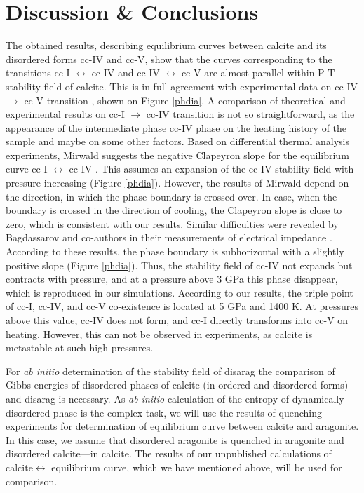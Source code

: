 \documentclass[journal=jacsat,manuscript=article]{achemso}
\begin{document}
			\section{Discussion \& Conclusions}

The obtained results, describing equilibrium curves between calcite and its disordered forms cc-IV and cc-V, show that the curves corresponding to the transitions cc-I $\leftrightarrow$ cc-IV and cc-IV $\leftrightarrow$ cc-V are almost parallel within P-T stability field of calcite. 
This is in full agreement with experimental data on cc-IV $\to$ cc-V transition \cite{bagdassarov2003, redfern1989, mirwald1976}, shown on Figure \ref{phdia}. 
A comparison of theoretical and experimental results on cc-I $\to$ cc-IV transition is not so straightforward, as the appearance of the intermediate phase cc-IV phase on the heating history of the sample and maybe on some other factors.
Based on differential thermal analysis experiments, Mirwald suggests the negative Clapeyron slope for the equilibrium curve cc-I $\leftrightarrow$ cc-IV  \cite{mirwald1976}. 
This assumes an expansion of the cc-IV stability field with pressure increasing (Figure \ref{phdia}).
However, the results of Mirwald depend on the direction, in which the phase boundary is crossed over.
In case, when the boundary is crossed in the direction of cooling, the Clapeyron slope is close to zero, which is consistent with our results. 
Similar difficulties were revealed by Bagdassarov and co-authors in their measurements of electrical impedance  \cite{bagdassarov2003}.
According to these results, the phase boundary is subhorizontal with a slightly positive slope (Figure \ref{phdia}). 
Thus, the stability field of cc-IV not expands but contracts with pressure, and at a pressure above 3 GPa this phase disappear, which is reproduced in our simulations. 
According to our results, the triple point of cc-I, cc-IV, and cc-V co-existence is located at 5 GPa and 1400 K.
At pressures above this value, cc-IV does not form, and cc-I directly transforms into cc-V on heating.
However, this can not be observed in experiments, as calcite is metastable at such high pressures.


For {\it ab initio} determination of the stability field of disarag the comparison of Gibbs energies of disordered phases of calcite (in ordered and disordered forms) and disarag is necessary.
As {\it ab initio} calculation of the entropy of dynamically disordered phase is the complex task, we will use the results of quenching experiments for determination of equilibrium curve between calcite and aragonite.
In this case, we assume that disordered aragonite is quenched in aragonite and disordered calcite---in calcite.
The results of our unpublished calculations of calcite$\leftrightarrow$ equilibrium curve, which we have mentioned above, will be used for comparison.
\end{document}
